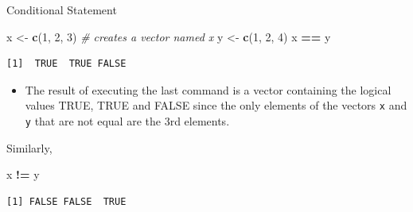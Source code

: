 \documentclass[
  ignorenonframetext,
]{beamer}
\newenvironment{Shaded}{\begin{snugshade}}{\end{snugshade}}
\newcommand{\CommentTok}[1]{\textcolor[rgb]{0.56,0.35,0.01}{\textit{#1}}}
\newcommand{\DecValTok}[1]{\textcolor[rgb]{0.00,0.00,0.81}{#1}}
\newcommand{\FunctionTok}[1]{\textcolor[rgb]{0.13,0.29,0.53}{\textbf{#1}}}
\newcommand{\NormalTok}[1]{#1}
\newcommand{\OtherTok}[1]{\textcolor[rgb]{0.56,0.35,0.01}{#1}}
\newcommand{\SpecialCharTok}[1]{\textcolor[rgb]{0.81,0.36,0.00}{\textbf{#1}}}
\providecommand{\tightlist}{%
  \setlength{\itemsep}{0pt}\setlength{\parskip}{0pt}}
\begin{document}
\begin{frame}[fragile]{Conditional Statement}
\label{conditional-statement}
\small

\begin{Shaded}
\begin{Highlighting}[]
\NormalTok{x }\OtherTok{\textless{}{-}} \FunctionTok{c}\NormalTok{(}\DecValTok{1}\NormalTok{, }\DecValTok{2}\NormalTok{, }\DecValTok{3}\NormalTok{)  }\CommentTok{\# creates a vector named x}
\NormalTok{y }\OtherTok{\textless{}{-}} \FunctionTok{c}\NormalTok{(}\DecValTok{1}\NormalTok{, }\DecValTok{2}\NormalTok{, }\DecValTok{4}\NormalTok{)}
\NormalTok{x }\SpecialCharTok{==}\NormalTok{ y}
\end{Highlighting}
\end{Shaded}

\begin{verbatim}
[1]  TRUE  TRUE FALSE
\end{verbatim}

\normalsize

\begin{itemize}
\tightlist
\item
  The result of executing the last command is a vector containing the
  logical values TRUE, TRUE and FALSE since the only elements of the
  vectors \texttt{x} and \texttt{y} that are not equal are the 3rd
  elements.
\end{itemize}

Similarly,

\small

\begin{Shaded}
\begin{Highlighting}[]
\NormalTok{x }\SpecialCharTok{!=}\NormalTok{ y}
\end{Highlighting}
\end{Shaded}

\begin{verbatim}
[1] FALSE FALSE  TRUE
\end{verbatim}

\normalsize
\end{frame}
\end{document}
